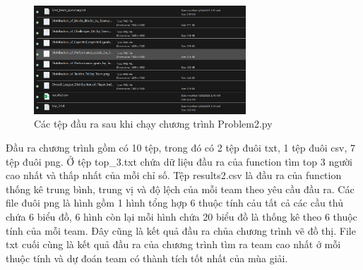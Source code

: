 \documentclass[12pt]{report}
\begin{document}
{\begin{figure}[h]
    \centering
    \includegraphics[width=300px]{P2_RES.png}
    \caption{Các tệp đầu ra sau khi chạy chương trình Problem2.py}
    \label{fig:output}
\end{figure}
Đầu ra chương trình gồm có 10 tệp, trong đó có 2 tệp đuôi txt, 1 tệp đuôi csv, 7 tệp đuôi png. Ở tệp top\_3.txt chứa dữ liệu đầu ra của function tìm top 3 người cao nhất và thấp nhất của mỗi chỉ số. Tệp results2.csv là đầu ra của function thống kê trung bình, trung vị và độ lệch của mỗi team theo yêu cầu đầu ra. Các file đuôi png là hình gồm 1 hình tổng hợp 6 thuộc tính cảu tất cả các cầu thủ chứa 6 biểu đồ, 6 hình còn lại mỗi hình chứa 20 biểu đồ là thống kê theo 6 thuộc tính của mỗi team. Đây cũng là kết quả đầu ra chủa chương trình vẽ đồ thị. File txt cuối cùng là kết quả đầu ra của chương trình tìm ra team cao nhất ở mỗi thuộc tính và dự đoán team có thành tích tốt nhất của mùa giải.
}
\end{document}
